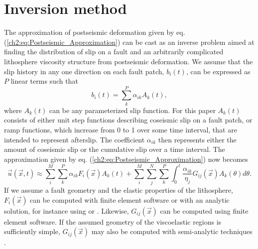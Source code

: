\section{Inversion method}\label{ch2:sec:InverseMethod}
The approximation of postseismic deformation given by eq.
(\ref{ch2:eq:Postseismic_Approximation}) can be cast as an inverse problem
aimed at finding the distribution of slip on a fault and an
arbitrarily complicated lithosphere viscosity structure from
postseismic deformation. We assume that the slip history in any one
direction on each fault patch, $b_i(t)$, can be expressed as $P$ linear
terms such that
\begin{equation}
b_i(t) = \sum_k^P \alpha_{ik}A_k(t),
\end{equation}
where $A_k(t)$ can be any parameterized slip function.  For this
paper $A_k(t)$ consists of either unit step functions describing
coseismic slip on a fault patch, or ramp functions, which increase
from 0 to 1 over some time interval, that are intended to represent
afterslip.  The coefficient $\alpha_{ik}$ then represents either the
amount of coseismic slip or the cumulative slip over a time interval.
The approximation given by eq. (\ref{ch2:eq:Postseismic_Approximation}) now
becomes
\begin{equation}\label{ch2:eq:Postseismic_Approximation2}
\vec{u}(\vec{x},t) \approx
\sum_i^M\sum_k^P\alpha_{ik}F_i(\vec{x})A_k(t) +
\sum_i^M\sum_j^N\sum_k^P\int_0^t\frac{\alpha_{ik}}{\eta_j}G_{ij}(\vec{x})A_k(\theta)d\theta.
\end{equation}
If we assume a fault geometry and the elastic properties of the
lithosphere, $F_i(\vec{x})$ can be computed with finite element
software or with an analytic solution, for instance using
\citet{Okada1992} or \citet{Meade2007}. Likewise, $G_{ij}(\vec{x})$ can be
computed using finite element software.  If the assumed geometry of
the viscoelastic regions is sufficiently simple, $G_{ij}(\vec{x})$ may
also be computed with semi-analytic techniques
\citep[e.g.,][]{Pollitz1997,Fukahata2006,Barbot2010}.

